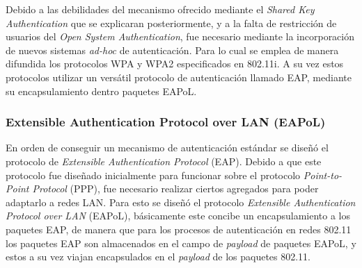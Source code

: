 \documentclass[10pt,a4paper]{article}
\begin{document}
Debido a las debilidades del mecanismo ofrecido mediante el \textit{Shared Key Authentication} que se explicaran posteriormente, y a la falta de restricción de usuarios del \textit{Open System Authentication}, fue necesario mediante la incorporación de nuevos sistemas \textit{ad-hoc} de autenticación. Para lo cual se emplea de manera difundida los protocolos WPA y WPA2 especificados en 802.11i. A su vez estos protocolos utilizar un versátil protocolo de autenticación llamado EAP, mediante su encapsulamiento dentro paquetes EAPoL. 

\subsubsection{Extensible Authentication Protocol over LAN (EAPoL)}

En orden de conseguir un mecanismo de autenticación estándar se diseñó el protocolo de \textit{Extensible Authentication Protocol} (EAP). Debido a que este protocolo fue diseñado inicialmente para funcionar sobre el protocolo \textit{Point-to-Point Protocol} (PPP), fue necesario realizar ciertos agregados para poder adaptarlo a redes LAN. Para esto se diseñó el protocolo \textit{Extensible Authentication Protocol over LAN} (EAPoL), básicamente este concibe un encapsulamiento a los paquetes EAP, de manera que para los procesos de autenticación en redes 802.11 los paquetes EAP son almacenados en el campo de \textit{payload} de paquetes EAPoL, y estos a su vez viajan encapsulados en el \textit{payload} de los paquetes 802.11.


\end{document}

